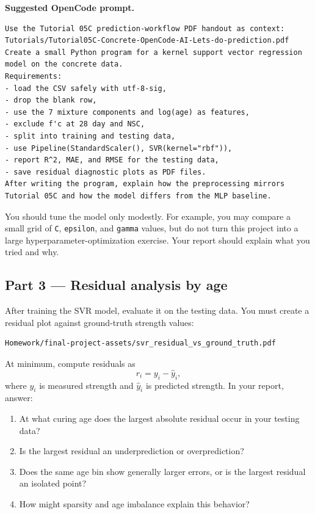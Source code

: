 \documentclass[12pt]{article}
\begin{document}
\begin{ex-box}
\textbf{Suggested OpenCode prompt.}
\begin{lstlisting}[style=term]
Use the Tutorial 05C prediction-workflow PDF handout as context:
Tutorials/Tutorial05C-Concrete-OpenCode-AI-Lets-do-prediction.pdf
Create a small Python program for a kernel support vector regression model on the concrete data.
Requirements:
- load the CSV safely with utf-8-sig,
- drop the blank row,
- use the 7 mixture components and log(age) as features,
- exclude f'c at 28 day and NSC,
- split into training and testing data,
- use Pipeline(StandardScaler(), SVR(kernel="rbf")),
- report R^2, MAE, and RMSE for the testing data,
- save residual diagnostic plots as PDF files.
After writing the program, explain how the preprocessing mirrors Tutorial 05C and how the model differs from the MLP baseline.
\end{lstlisting}
\end{ex-box}

You should tune the model only modestly.  For example, you may compare a small grid of \texttt{C}, \texttt{epsilon}, and \texttt{gamma} values, but do not turn this project into a large hyperparameter-optimization exercise.  Your report should explain what you tried and why.

\subsection{Part 3 --- Residual analysis by age}

After training the SVR model, evaluate it on the testing data.  You must create a residual plot against ground-truth strength values:

\begin{lstlisting}[style=term]
Homework/final-project-assets/svr_residual_vs_ground_truth.pdf
\end{lstlisting}

At minimum, compute residuals as
\[
  r_i = y_i - \hat{y}_i,
\]
where $y_i$ is measured strength and $\hat{y}_i$ is predicted strength.  In your report, answer:

\begin{enumerate}[label=(\alph*)]
  \item At what curing age does the largest absolute residual occur in your testing data?
  \item Is the largest residual an underprediction or overprediction?
  \item Does the same age bin show generally larger errors, or is the largest residual an isolated point?
  \item How might sparsity and age imbalance explain this behavior?
\end{enumerate}
\end{document}
